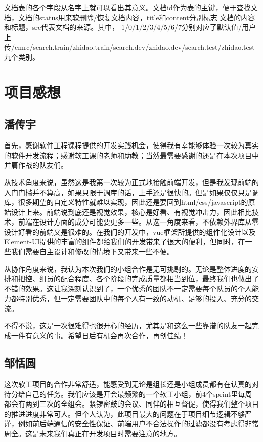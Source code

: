 \documentclass[12pt]{article}
\begin{document}
文档表的各个字段从名字上就可以看出其意义。文档id作为表的主键，便于查找文档，文档的status用来软删除/恢复文档内容，title和content分别标志
文档的内容和标题，src代表文档的来源。其中，-1/0/1/2/3/4/5/6/7分别对应了默认值/用户上传/cmrc/\newline search.train/zhidao.train/search.dev/zhidao.dev/search.test/zhidao.test九个类别。

\section{项目感想}  %
\subsection{潘传宇}
首先，感谢软件工程课程提供的开发实践机会，使得我有幸能够体验一次较为真实的软件开发流程；感谢软工课的老师和助教；当然最需要感谢的还是在本次项目中并肩作战的队友们。

从技术角度来说，虽然这是我第一次较为正式地接触前端开发，但是我发现前端的入门门槛并不算高，如果只限于调库的话，上手还是很快的。但是如果仅仅只是调库，很多期望的自定义特性就难以实现，因此还是要回到html/css/javascript的原始设计上来。前端说到底还是视觉效果，核心是好看、有视觉冲击力，因此相比技术，前端在设计方面的成分可能要更多一些。从这一角度来看，不依赖外界库从零设计好看的前端又是很难的。在我们的开发中，vue框架所提供的组件化设计以及Element-UI提供的丰富的组件都给我们的开发带来了很大的便利，但同时，在一些我们需要自主设计和修改的情境下又带来一些不便。

从协作角度来说，我认为本次我们的小组合作是无可挑剔的。无论是整体进度的安排和把控、组员的配合程度、各个阶段的完成质量都相当到位，最终我们也做出了不错的效果。这让我深刻认识到了，一个优秀的团队不一定需要每个队员的个人能力都特别优秀，但一定需要团队中的每个人有一致的动机、足够的投入、充分的交流。

不得不说，这是一次很难得也很开心的经历，尤其是和这么一些靠谱的队友一起完成一件有意义的事。希望日后有机会再次合作，再创佳绩！

\subsection{邹恬圆}
这次软工项目的合作非常舒适，能感受到无论是组长还是小组成员都有在认真的对待分给自己的任务。我们应该是开会最频繁的一个软工小组，前4个sprint里每周都会有两到三次的全组会。紧锣密鼓的会议、同伴的相互督促，使得我们整个项目的推进进度非常可人。但个人认为，此项目最大的问题在于项目细节逻辑不够严谨，例如前后端通信的安全性保证、前端用户不合法操作的过滤都没有考虑得非常周全。这是未来我们真正在开发项目时需要注意的地方。
\end{document}
